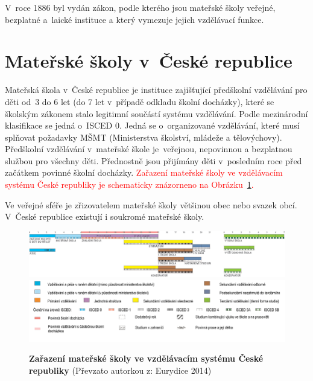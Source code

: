 		V roce 1886 byl vydán zákon, podle kterého jsou mateřské školy veřejné, bezplatné a laické instituce a který vymezuje jejich vzdělávací funkce.



	\section{Mateřské školy v~České republice}


		Mateřská škola v České republice je instituce zajišťující předškolní vzdělávání pro děti od 3 do 6 let (do 7 let v případě odkladu školní docházky), které se školským zákonem stalo legitimní součástí systému vzdělávání. Podle mezinárodní klasifikace se jedná o ISCED 0. Jedná se o~organizované vzdělávání, které musí splňovat požadavky MŠMT (Ministerstva školství, mládeže a tělovýchovy). Předškolní vzdělávání v~mateřské škole je veřejnou, nepovinnou a bezplatnou službou pro všechny děti. Přednostně jsou přijímány děti v posledním roce před začátkem povinné školní docházky. 
		\textcolor{red}{Zařazení mateřské školy ve vzdělávacím systému České republiky je schematicky znázorneno na Obrázku~\ref{obr:msCR}.}
		
		\noindent
		Ve veřejné sféře je zřizovatelem mateřské školy většinou obec nebo svazek obcí. V České republice existují i soukromé mateřské školy.
		
		\begin{figure} [t]
			\center
			\includegraphics[width=1.0\linewidth]{fotky/msCR.png} \\
			\includegraphics[width=1.0\linewidth]{fotky/msVysvetlivky.png}
			\caption{ \textbf{Zařazení mateřské školy ve vzdělávacím systému České republiky}
			(Převzato autorkou z: Eurydice 2014)
			}
			\label{obr:msCR}
		\end{figure}


